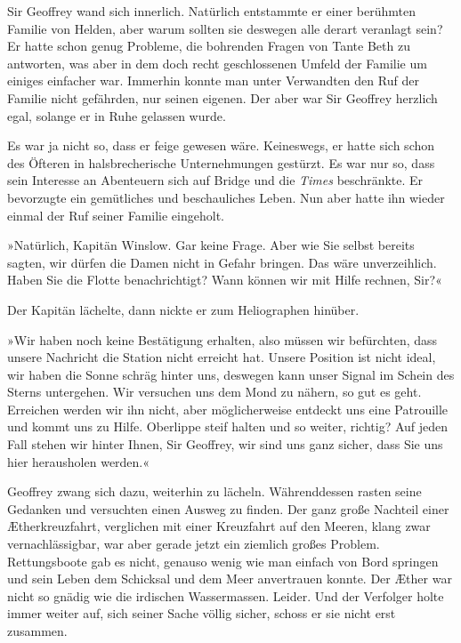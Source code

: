 \bigpar

Sir Geoffrey wand sich innerlich. Natürlich entstammte er einer
berühmten Familie von Helden, aber warum sollten sie deswegen alle
derart veranlagt sein? Er hatte schon genug Probleme, die bohrenden
Fragen von Tante Beth zu antworten, was aber in dem doch recht
geschlossenen Umfeld der Familie um einiges einfacher war. Immerhin
konnte man unter Verwandten den Ruf der Familie nicht gefährden,
nur seinen eigenen. Der aber war Sir Geoffrey herzlich egal,
solange er in Ruhe gelassen wurde.

Es war ja nicht so, dass er feige gewesen wäre. Keineswegs, er
hatte sich schon des Öfteren in halsbrecherische Unternehmungen
gestürzt. Es war nur so, dass sein Interesse an Abenteuern sich auf
Bridge und die \textit{Times} beschränkte. Er bevorzugte ein gemütliches und
beschauliches Leben. Nun aber hatte ihn wieder einmal der Ruf
seiner Familie eingeholt.

»Natürlich, Kapitän Winslow. Gar keine Frage. Aber wie Sie selbst
bereits sagten, wir dürfen die Damen nicht in Gefahr bringen. Das
wäre unverzeihlich. Haben Sie die Flotte benachrichtigt? Wann
können wir mit Hilfe rechnen, Sir?«

Der Kapitän lächelte, dann nickte er zum Heliographen hinüber.

»Wir haben noch keine Bestätigung erhalten, also müssen wir
befürchten, dass unsere Nachricht die Station nicht erreicht hat.
Unsere Position ist nicht ideal, wir haben die Sonne schräg hinter
uns, deswegen kann unser Signal im Schein des Sterns untergehen.
Wir versuchen uns dem Mond zu nähern, so gut es geht. Erreichen
werden wir ihn nicht, aber möglicherweise entdeckt uns eine
Patrouille und kommt uns zu Hilfe. Oberlippe steif halten und so
weiter, richtig? Auf jeden Fall stehen wir hinter Ihnen, Sir
Geoffrey, wir sind uns ganz sicher, dass Sie uns hier herausholen
werden.«

 Geoffrey zwang sich dazu,
weiterhin zu lächeln. Währenddessen rasten seine Gedanken und
versuchten einen Ausweg zu finden. Der ganz große Nachteil einer
Ætherkreuzfahrt, verglichen mit einer Kreuzfahrt auf den Meeren,
klang zwar vernachlässigbar, war aber gerade jetzt ein ziemlich
großes Problem. Rettungsboote gab es nicht, genauso wenig wie man
einfach von Bord springen und sein Leben dem Schicksal und dem Meer
anvertrauen konnte. Der Æther war nicht so gnädig wie die irdischen
Wassermassen. Leider. Und der Verfolger holte immer weiter auf,
sich seiner Sache völlig sicher, schoss er sie nicht erst
zusammen.


